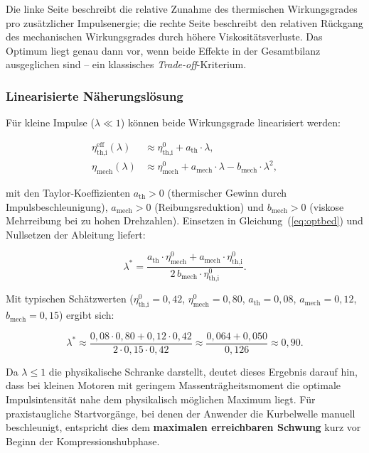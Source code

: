 ﻿\documentclass[a4paper,12pt]{article}
\begin{document}
Die linke Seite beschreibt die relative Zunahme des thermischen Wirkungsgrades
pro zusätzlicher Impulsenergie; die rechte Seite beschreibt den relativen
Rückgang des mechanischen Wirkungsgrades durch höhere Viskositätsverluste.
Das Optimum liegt genau dann vor, wenn beide Effekte in der Gesamtbilanz
ausgeglichen sind -- ein klassisches \emph{Trade-off}-Kriterium.

\subsubsection*{Linearisierte Näherungslösung}

Für kleine Impulse ($\lambda \ll 1$) können beide Wirkungsgrade linearisiert werden:

\begin{align}
  \eta_\text{th,i}^\text{eff}(\lambda) &\approx \eta_\text{th,i}^0 +
    a_\text{th} \cdot \lambda, \label{eq:lin_th}\\
  \eta_\text{mech}(\lambda) &\approx \eta_\text{mech}^0 +
    a_\text{mech} \cdot \lambda - b_\text{mech} \cdot \lambda^2, \label{eq:lin_mech}
\end{align}

\noindent
mit den Taylor-Koeffizienten $a_\text{th} > 0$ (thermischer Gewinn durch
Impulsbeschleunigung), $a_\text{mech} > 0$ (Reibungsreduktion) und
$b_\text{mech} > 0$ (viskose Mehrreibung bei zu hohen Drehzahlen).
Einsetzen in Gleichung~(\ref{eq:optbed}) und Nullsetzen der Ableitung liefert:

\begin{equation}
  \lambda^* = \frac{a_\text{th} \cdot \eta_\text{mech}^0
    + a_\text{mech} \cdot \eta_\text{th,i}^0}
    {2\, b_\text{mech} \cdot \eta_\text{th,i}^0}.
  \label{eq:lambda_opt}
\end{equation}

Mit typischen Schätzwerten ($\eta_\text{th,i}^0 = 0{,}42$,
$\eta_\text{mech}^0 = 0{,}80$, $a_\text{th} = 0{,}08$,
$a_\text{mech} = 0{,}12$, $b_\text{mech} = 0{,}15$) ergibt sich:

\begin{equation}
  \lambda^* \approx
    \frac{0{,}08 \cdot 0{,}80 + 0{,}12 \cdot 0{,}42}
         {2 \cdot 0{,}15 \cdot 0{,}42}
  \approx \frac{0{,}064 + 0{,}050}{0{,}126}
  \approx 0{,}90.
  \label{eq:lambda_num_roh}
\end{equation}

Da $\lambda \leq 1$ die physikalische Schranke darstellt, deutet dieses Ergebnis
darauf hin, dass bei kleinen Motoren mit geringem Massenträgheitsmoment die
optimale Impulsintensität nahe dem physikalisch möglichen Maximum liegt. Für
praxistaugliche Startvorgänge, bei denen der Anwender die Kurbelwelle manuell
beschleunigt, entspricht dies dem \textbf{maximalen erreichbaren Schwung} kurz
vor Beginn der Kompressionshubphase.
\end{document}
